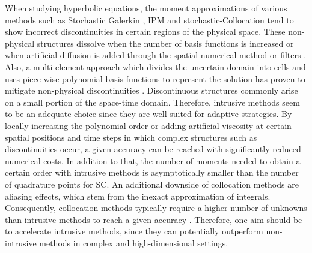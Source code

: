 When studying hyperbolic equations, the moment approximations of various methods such as Stochastic Galerkin \cite{le2004uncertainty}, IPM \cite{kusch2018filtered} and stochastic-Collocation \cite{barth2013non,dwight2013adaptive} tend to show incorrect discontinuities in certain regions of the physical space. These non-physical structures dissolve when the number of basis functions is increased \cite{pettersson2009numerical,offner2017stability} or when artificial diffusion is added through the spatial numerical method \cite{offner2017stability} or filters \cite{kusch2018filtered}. Also, a multi-element approach which divides the uncertain domain into cells and uses piece-wise polynomial basis functions to represent the solution has proven to mitigate non-physical discontinuities \cite{wan2006multi,durrwachter2018hyperbolicity}. Discontinuous structures commonly arise on a small portion of the space-time domain. Therefore, intrusive methods seem to be an adequate choice since they are well suited for adaptive strategies. By locally increasing the polynomial order \cite{tryoen2012adaptive,kroker2012finite,giesselmann2017posteriori} or adding artificial viscosity \cite{kusch2018filtered} at certain spatial positions and time steps in which complex structures such as discontinuities occur, a given accuracy can be reached with significantly reduced numerical costs. In addition to that, the number of moments needed to obtain a certain order with intrusive methods is asymptotically smaller than the number of quadrature points for SC. An additional downside of collocation methods are aliasing effects, which stem from the inexact approximation of integrals. Consequently, collocation methods typically require a higher number of unknowns than intrusive methods to reach a given accuracy \cite{xiu2009fast,alekseev2011estimation}. Therefore, one aim should be to accelerate intrusive methods, since they can potentially outperform non-intrusive methods in complex and high-dimensional settings. \\

